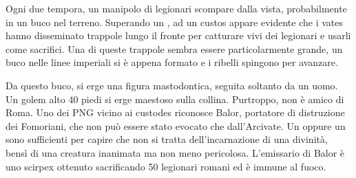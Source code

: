 \documentclass[11.5pt,twocolumn]{article}
\begin{document}
Ogni due tempora, un manipolo di legionari scompare dalla vista, probabilmente in un buco nel terreno.
Superando un , ad un custos appare evidente che i vates hanno disseminato trappole lungo il fronte per catturare vivi dei legionari e usarli come sacrifici.
Una di queste trappole sembra essere particolarmente grande, un buco nelle linee imperiali si \`{e} appena formato e i ribelli spingono per avanzare.


Da questo buco, si erge una figura mastodontica, seguita soltanto da un uomo.
Un golem alto 40 piedi si erge maestoso sulla collina.
Purtroppo, non \`{e} amico di Roma.
Uno dei PNG vicino ai custodes riconosce Balor, portatore di distruzione dei Fomoriani, che non pu\`{o} essere stato evocato che dall'Arcivate.
Un  oppure un  sono sufficienti per capire che non si tratta dell'incarnazione di una divinit\`{a}, bens\`{i} di una creatura inanimata ma non meno pericolosa.
L'emissario di Balor \`{e} uno scirpex ottenuto sacrificando 50 legionari romani ed \`{e} immune al fuoco.
\end{document}
